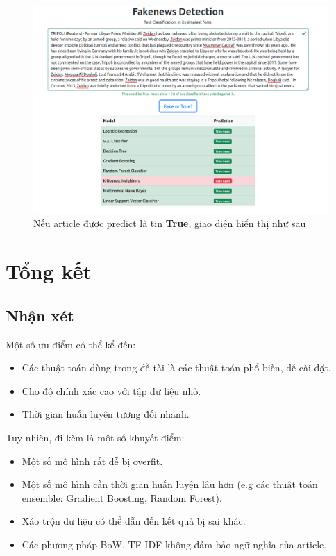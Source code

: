 \documentclass[12pt]{article}
\begin{document}
\begin{figure}[H]
\centering
\includegraphics[scale=.3]{img/true-result.png}
\caption{Nếu article được predict là tin \textbf{True}, giao diện hiển thị như sau}
\label{fig:true-result}
\end{figure}

\section{Tổng kết}
\subsection{Nhận xét}
Một số ưu điểm có thể kể đến:
\begin{itemize}
\item Các thuật toán dùng trong đề tài là các thuật toán phổ biến, dễ cài đặt.
\item Cho độ chính xác cao với tập dữ liệu nhỏ.
\item Thời gian huấn luyện tương đối nhanh.
\end{itemize}
Tuy nhiên, đi kèm là một số khuyết điểm:
\begin{itemize}
\item Một số mô hình rất dễ bị overfit.
\item Một số mô hình cần thời gian huấn luyện lâu hơn (e.g các thuật toán ensemble: Gradient Boosting, Random Forest).
\item Xáo trộn dữ liệu có thể dẫn đến kết quả bị sai khác.\cite{Kowsari_2019}
\item Các phương pháp BoW, TF-IDF không đảm bảo ngữ nghĩa của article.
\end{itemize}
\end{document}
